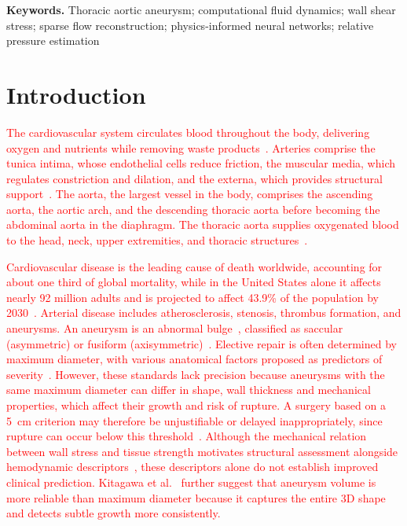 \documentclass[12pt,a4paper]{article}
\theoremstyle{definition}
\numberwithin{equation}{section}
\newcommand{\revision}[1]{\textcolor{red}{#1}}
\begin{document}
\noindent\textbf{Keywords.} Thoracic aortic aneurysm; computational fluid dynamics; wall shear stress; sparse flow reconstruction; physics-informed neural networks; relative pressure estimation

\section{Introduction}
\label{sec:introduction}

\revision{The cardiovascular system circulates blood throughout the body, delivering oxygen and nutrients while removing waste products~\cite{heymans1960reflexogenic}. Arteries comprise the tunica intima, whose endothelial cells reduce friction, the muscular media, which regulates constriction and dilation, and the externa, which provides structural support~\cite{holzapfel2010modelling}. The aorta, the largest vessel in the body, comprises the ascending aorta, the aortic arch, and the descending thoracic aorta before becoming the abdominal aorta in the diaphragm. The thoracic aorta supplies oxygenated blood to the head, neck, upper extremities, and thoracic structures~\cite{tran2018anatomy}.}

\revision{Cardiovascular disease is the leading cause of death worldwide, accounting for about one third of global mortality, while in the United States alone it affects nearly 92 million adults and is projected to affect 43.9\% of the population by 2030~\cite{Randles_CFD_2017}. Arterial disease includes atherosclerosis, stenosis, thrombus formation, and aneurysms. An aneurysm is an abnormal bulge~\cite{Les_et_al_2010}, classified as saccular (asymmetric) or fusiform (axisymmetric)~\cite{sakalihasan2018abdominal}. Elective repair is often determined by maximum diameter, with various anatomical factors proposed as predictors of severity~\cite{cronenwett1990variables, lipp2020computational}. However, these standards lack precision because aneurysms with the same maximum diameter can differ in shape, wall thickness and mechanical properties, which affect their growth and risk of rupture. A surgery based on a 5~cm criterion may therefore be unjustifiable or delayed inappropriately, since rupture can occur below this threshold~\cite{darling1977autopsy, belkacemi2022flow}. Although the mechanical relation between wall stress and tissue strength motivates structural assessment alongside hemodynamic descriptors~\cite{bilgi2020effects, vorp1998mechanical}, these descriptors alone do not establish improved clinical prediction. Kitagawa et al.~\cite{kitagawa2013role} further suggest that aneurysm volume is more reliable than maximum diameter because it captures the entire 3D shape and detects subtle growth more consistently.}
\end{document}
